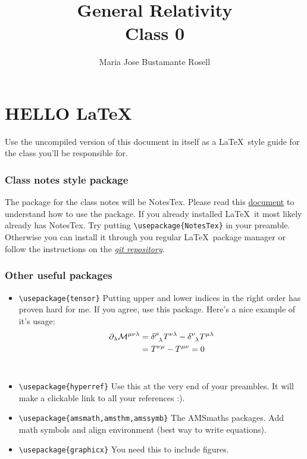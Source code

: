 \documentclass[10pt]{article}
\title{{\Huge General Relativity}\\{\Large{Class 0}}} %
\author{Maria Jose Bustamante Rosell}
\newcommand{\bs}{\textbackslash}
\begin{document}
    \maketitle
    \flushbottom
    \newpage
    \pagestyle{fancynotes}
    \part{HELLO \LaTeX\,}
	Use the uncompiled version of this document in itself as a \LaTeX\, style guide for the class you'll be responsible for.
              	\section{Class notes style package}\label{sec:class_style}
              		The package for the class notes will be NotesTex. 
    			Please read this \href{https://github.com/Adhumunt/NotesTeX/blob/master/NoTeX/NotesTeX.pdf}{document} to understand how to use the package. 
    			If you already installed \LaTeX\, it most likely already has NotesTex. 
    			Try putting \texttt{\bs usepackage\{NotesTex\}} in your preamble.  
    			Otherwise you can install it through you regular \LaTeX\, package manager or follow the instructions on the \href{https://github.com/Adhumunt/NotesTeX}{\textit{git repository}}.
               	\section{Other useful packages}\label{sec:useful_pkg}
               		\begin{itemize}
               			\item \texttt{\bs usepackage\{tensor\}} Putting upper and lower indices in the right order has proven hard for me. If you agree, use this package. Here's a nice example of it's usage:
                				\begin{align*}
            					\partial_\lambda \tensor{\mathcal{M}}{^\mu^\nu^\lambda} &= \tensor{\delta}{^\mu_\lambda} T^{\nu \lambda}-\tensor{\delta}{^\nu_\lambda} T^{\mu \lambda}\\
                    					&= T^{\nu\mu}-T^{\mu\nu} =0
                				\end{align*}   \
               			\item \texttt{\bs usepackage\{hyperref\}} Use this at the very end of your preambles. 
    					It will make a clickable link to all your references :).
               			\item \texttt{\bs usepackage\{amsmath,amsthm,amssymb\}} The AMSmaths packages. 
    					Add math symbols and align environment (best way to write equations).
               			\item \texttt{\bs usepackage\{graphicx\}} You need this to include figures. 
               		\end{itemize}
\end{document}
